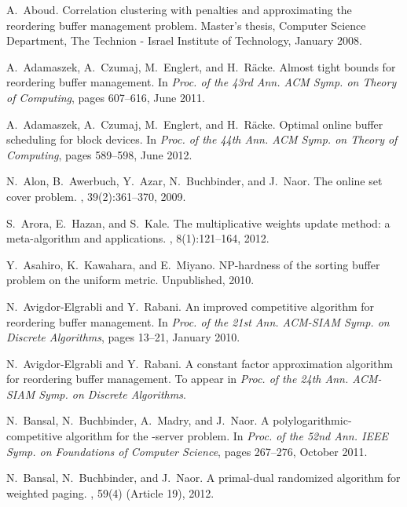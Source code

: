 \documentclass[12pt]{article}
\begin{document}

\begin{thebibliography}{10}


A.~Aboud.
\newblock Correlation clustering with penalties and approximating the
  reordering buffer management problem.
\newblock Master's thesis, Computer Science Department, The {Technion} -
  {Israel} Institute of Technology, January 2008.

A.~Adamaszek, A.~Czumaj, M.~Englert, and H.~R\"acke.
\newblock Almost tight bounds for reordering buffer management.
\newblock In {\em Proc. of the 43rd Ann. ACM Symp. on Theory of Computing},
  pages 607--616, June 2011.

A.~Adamaszek, A.~Czumaj, M.~Englert, and H.~R\"acke.
\newblock Optimal online buffer scheduling for block devices.
\newblock In {\em Proc. of the 44th Ann. ACM Symp. on Theory of Computing},
 pages 589--598, June 2012.



N.~Alon, B.~Awerbuch, Y.~Azar, N.~Buchbinder, and J.~Naor.
\newblock The online set cover problem.
, 39(2):361--370, 2009.

S.~Arora, E.~Hazan, and S.~Kale.
\newblock The multiplicative weights update method: a meta-algorithm and applications.
, 8(1):121--164, 2012.

Y.~Asahiro, K.~Kawahara, and E.~Miyano.
\newblock NP-hardness of the sorting buffer problem on the uniform metric.
\newblock Unpublished, 2010.

N.~Avigdor-Elgrabli and Y.~Rabani.
\newblock An improved competitive algorithm for reordering buffer management.
\newblock In {\em Proc. of the 21st Ann. ACM-SIAM Symp. on Discrete Algorithms},
  pages 13--21, January 2010.

N.~Avigdor-Elgrabli and Y.~Rabani.
\newblock A constant factor approximation algorithm for reordering buffer management.
\newblock To appear in {\em Proc. of the 24th Ann. ACM-SIAM Symp. on Discrete Algorithms}.



N.~Bansal, N.~Buchbinder, A.~Madry, and J.~Naor.
\newblock A polylogarithmic-competitive algorithm for the -server problem.
\newblock In {\em Proc. of the 52nd Ann. IEEE Symp. on Foundations of Computer Science},
pages 267--276, October 2011.

N.~Bansal, N.~Buchbinder, and J.~Naor.
\newblock A primal-dual randomized algorithm for weighted paging.
, 59(4) (Article 19), 2012.


\end{thebibliography}
\end{document}
